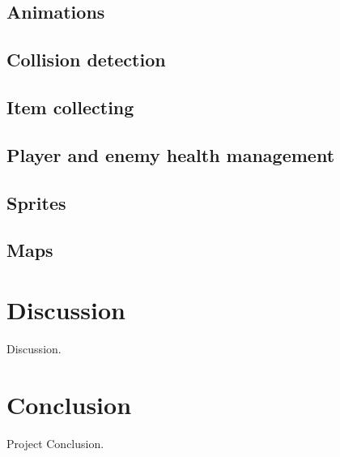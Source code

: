 \documentclass[12p]{article}
\begin{document}
\subsection{Animations}

\subsection{Collision detection}

\subsection{Item collecting}

\subsection{Player and enemy health management}

\subsection{Sprites}

\subsection{Maps}


\newpage
\section{Discussion}

Discussion.


\newpage
\section{Conclusion}

Project Conclusion.

\end{document}
